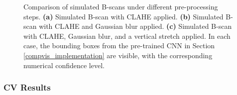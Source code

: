         
        \begin{figure}[htbp]
          \centering
        
          \hfill
          \hfill
        
          \caption[Comparison of simulated B-scans under different pre-processing steps]{Comparison of simulated B-scans under different pre-processing steps. 
          \textbf{(a)} Simulated B-scan with CLAHE applied. 
          \textbf{(b)} Simulated B-scan with CLAHE and Gaussian blur applied. 
          \textbf{(c)} Simulated B-scan with CLAHE, Gaussian blur, and a vertical stretch applied. 
          In each case, the bounding boxes from the pre-trained CNN in Section \ref{compvis_implementation} are visible, with the corresponding numerical confidence level.}
          \label{fig:sim_bscan_comparison}
        \end{figure}
        
    
    \subsubsection{CV Results}
    
